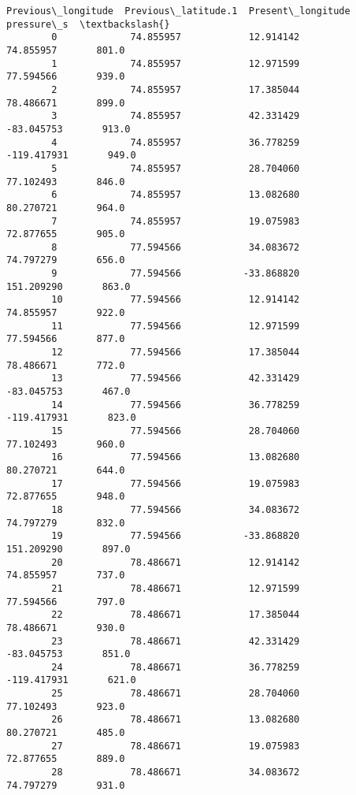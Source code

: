 \documentclass[11pt]{article}
\begin{document}
\begin{Verbatim}[commandchars=\\\{\}]
             Previous\_longitude  Previous\_latitude.1  Present\_longitude  pressure\_s  \textbackslash{}
        0             74.855957            12.914142          74.855957       801.0   
        1             74.855957            12.971599          77.594566       939.0   
        2             74.855957            17.385044          78.486671       899.0   
        3             74.855957            42.331429         -83.045753       913.0   
        4             74.855957            36.778259        -119.417931       949.0   
        5             74.855957            28.704060          77.102493       846.0   
        6             74.855957            13.082680          80.270721       964.0   
        7             74.855957            19.075983          72.877655       905.0   
        8             77.594566            34.083672          74.797279       656.0   
        9             77.594566           -33.868820         151.209290       863.0   
        10            77.594566            12.914142          74.855957       922.0   
        11            77.594566            12.971599          77.594566       877.0   
        12            77.594566            17.385044          78.486671       772.0   
        13            77.594566            42.331429         -83.045753       467.0   
        14            77.594566            36.778259        -119.417931       823.0   
        15            77.594566            28.704060          77.102493       960.0   
        16            77.594566            13.082680          80.270721       644.0   
        17            77.594566            19.075983          72.877655       948.0   
        18            77.594566            34.083672          74.797279       832.0   
        19            77.594566           -33.868820         151.209290       897.0   
        20            78.486671            12.914142          74.855957       737.0   
        21            78.486671            12.971599          77.594566       797.0   
        22            78.486671            17.385044          78.486671       930.0   
        23            78.486671            42.331429         -83.045753       851.0   
        24            78.486671            36.778259        -119.417931       621.0   
        25            78.486671            28.704060          77.102493       923.0   
        26            78.486671            13.082680          80.270721       485.0   
        27            78.486671            19.075983          72.877655       889.0   
        28            78.486671            34.083672          74.797279       931.0   

\end{Verbatim}
\end{document}
